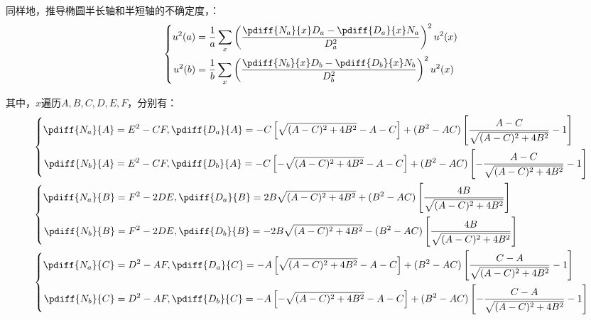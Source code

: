 \documentclass{article}
\begin{document}
同样地，推导椭圆半长轴和半短轴的不确定度，：
\begin{equation}
  \left\{
  \begin{aligned}
    u^2(a)&=\frac{1}{a}\sum_{x}\left(\frac{\pdiff{N_a}{x}D_a-\pdiff{D_a}{x}N_a}{D^2_a}\right)^2u^2(x)\\
    u^2(b)&=\frac{1}{b}\sum_{x}\left(\frac{\pdiff{N_b}{x}D_b-\pdiff{D_b}{x}N_b}{D^2_b}\right)^2u^2(x)\\
  \end{aligned}\right.
\end{equation}\par
其中，$x$遍历$A,B,C,D,E,F$，分别有：
\begin{align*}
  &\left\{
    \begin{aligned}
      \pdiff{N_a}{A}&=E^2-CF,\pdiff{D_a}{A}=-C\left[\sqrt{(A-C)^2+4B^2}-A-C\right]+(B^2-AC)\left[\frac{A-C}{\sqrt{(A-C)^2+4B^2}}-1\right]\\
      \pdiff{N_b}{A}&=E^2-CF,\pdiff{D_b}{A}=-C\left[-\sqrt{(A-C)^2+4B^2}-A-C\right]+(B^2-AC)\left[-\frac{A-C}{\sqrt{(A-C)^2+4B^2}}-1\right]\\ 
    \end{aligned}
  \right.\\
  &\left\{
    \begin{aligned}
      \pdiff{N_a}{B}&=F^2-2DE,\pdiff{D_a}{B}=2B\sqrt{(A-C)^2+4B^2}+(B^2-AC)\left[\frac{4B}{\sqrt{(A-C)^2+4B^2}}\right]\\
      \pdiff{N_b}{B}&=F^2-2DE,\pdiff{D_b}{B}=-2B\sqrt{(A-C)^2+4B^2}-(B^2-AC)\left[\frac{4B}{\sqrt{(A-C)^2+4B^2}}\right]\\ 
    \end{aligned}
  \right.\\
  &\left\{
    \begin{aligned}
      \pdiff{N_a}{C}&=D^2-AF,\pdiff{D_a}{C}=-A\left[\sqrt{(A-C)^2+4B^2}-A-C\right]+(B^2-AC)\left[\frac{C-A}{\sqrt{(A-C)^2+4B^2}}-1\right]\\
      \pdiff{N_b}{C}&=D^2-AF,\pdiff{D_b}{C}=-A\left[-\sqrt{(A-C)^2+4B^2}-A-C\right]+(B^2-AC)\left[-\frac{C-A}{\sqrt{(A-C)^2+4B^2}}-1\right]\\ 
    \end{aligned}
  \right.
\end{align*}
\end{document}
